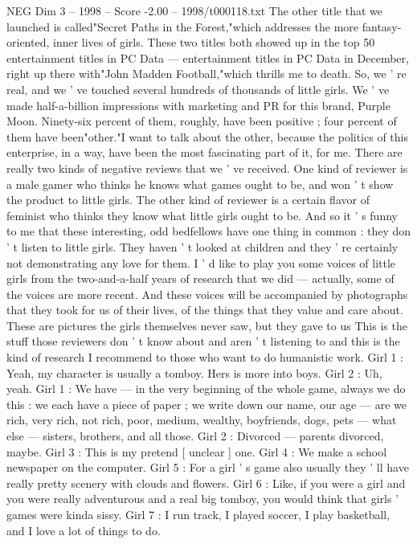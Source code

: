 \begin{textsample}{NEG Dim 3 – 1998 – Score -2.00 – 1998/t000118.txt}
The other title that we launched is called"Secret Paths in the Forest,"which addresses the more fantasy-oriented, inner lives of girls.
These two titles both showed up in the top 50 entertainment titles in PC Data — entertainment titles in PC Data in December, right up there with"John Madden Football,"which thrills me to death.
So, we ' re real, and we ' ve touched several hundreds of thousands of little girls.
We ' ve made half-a-billion impressions with marketing and PR for this brand, Purple Moon.
Ninety-six percent of them, roughly, have been positive ; four percent of them have been"other."I want to talk about the other, because the politics of this enterprise, in a way, have been the most fascinating part of it, for me.
There are really two kinds of negative reviews that we ' ve received.
One kind of reviewer is a male gamer who thinks he knows what games ought to be, and won ' t show the product to little girls.
The other kind of reviewer is a certain flavor of feminist who thinks they know what little girls ought to be.
And so it ' s funny to me that these interesting, odd bedfellows have one thing in common : they don ' t listen to little girls.
They haven ' t looked at children and they ' re certainly not demonstrating any love for them.
I ' d like to play you some voices of little girls from the two-and-a-half years of research that we did — actually, some of the voices are more recent.
And these voices will be accompanied by photographs that they took for us of their lives, of the things that they value and care about.
These are pictures the girls themselves never saw, but they gave to us This is the stuff those reviewers don ' t know about and aren ' t listening to and this is the kind of research I recommend to those who want to do humanistic work.
Girl 1 : Yeah, my character is usually a tomboy.
Hers is more into boys.
Girl 2 : Uh, yeah.
Girl 1 : We have — in the very beginning of the whole game, always we do this : we each have a piece of paper ; we write down our name, our age — are we rich, very rich, not rich, poor, medium, wealthy, boyfriends, dogs, pets — what else — sisters, brothers, and all those.
Girl 2 : Divorced — parents divorced, maybe.
Girl 3 : This is my pretend [ unclear ] one.
Girl 4 : We make a school newspaper on the computer.
Girl 5 : For a girl ' s game also usually they ' ll have really pretty scenery with clouds and flowers.
Girl 6 : Like, if you were a girl and you were really adventurous and a real big tomboy, you would think that girls ' games were kinda sissy.
Girl 7 : I run track, I played soccer, I play basketball, and I love a lot of things to do.

\end{textsample}
